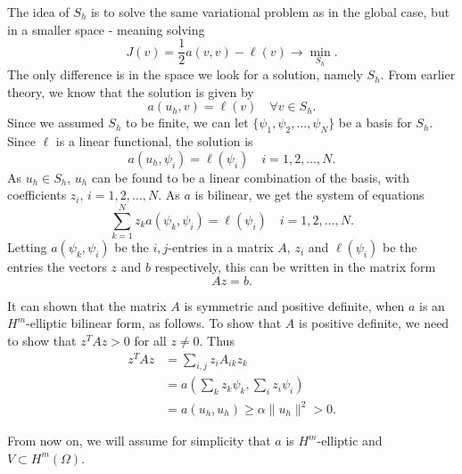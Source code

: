 The idea of $S_h$ is to solve the same variational problem as in the global case, 
but in a smaller space - meaning solving
\begin{equation*}
    J(v) = \frac{1}{2}a(v,v) - \ell(v) \to \underset{S_h}{\min}.
\end{equation*}
The only difference is in the space we look for a solution, namely $S_h$. From 
earlier theory, we know that the solution is given by 
\begin{equation*}
    a(u_h,v) = \ell(v) \quad \forall v \in S_h.
\end{equation*}
Since we assumed $S_h$ to be finite, we can let $ \{ \psi_1, \psi_2, \ldots, \psi_N \}$ 
be a basis for $S_h$. Since $\ell$ is a linear functional, 
the solution is 
\begin{equation*}
    a(u_h, \psi_i) = \ell(\psi_i) \quad i = 1, 2, \ldots, N.
\end{equation*}
As $u_h \in S_h$, $u_h$ can be found to be a linear combination of the basis, with 
coefficients $z_i$, $i=1, 2, \ldots, N$. As $a$ is bilinear, we get the system of 
equations
\begin{equation*}
    \sum_{k=1}^N z_k a(\psi_k,\psi_i) = \ell(\psi_i) \quad i = 1,2,\ldots,N.
\end{equation*}
Letting $a(\psi_k,\psi_i)$ be the $i,j$-entries in a matrix $A$, $z_i$ and $\ell(\psi_i)$ 
be the entries the vectors $z$ and $b$ respectively, this can be written in the matrix form 
\begin{equation*}
    Az = b.
\end{equation*}

It can shown that the matrix $A$ is symmetric and positive definite, when $a$ is an $H^m$-elliptic bilinear form, as follows. 
To show that $A$ is positive definite, we need to show that $z^TAz > 0$ for all $z \neq 0$. Thus
\begin{align*}
    z^TAz &= \sum_{i,j} z_iA_{ik}z_k \\
    &= a\left(\sum_{k} z_k\psi_k,\sum_{i} z_i\psi_i\right) \\
    &= a(u_h,u_h) \geq \alpha \|u_h\|^2 > 0.
\end{align*}

From now on, we will assume for simplicity that $a$ is $H^m$-elliptic and $V\subset H^m(\Omega)$.